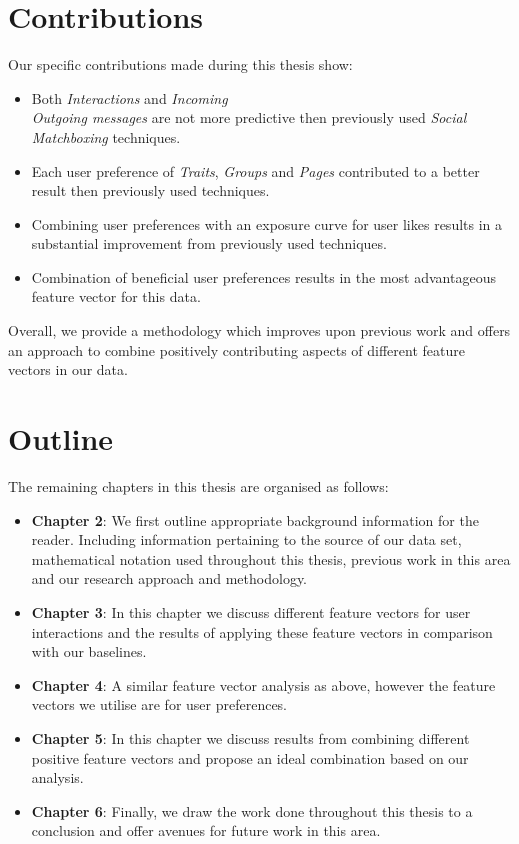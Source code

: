 \section{Contributions}
\label{sec:contributions}

Our specific contributions made during this thesis show:

\begin{itemize}
\item Both \emph{Interactions} and \emph{Incoming\\Outgoing messages} are not more predictive then previously used \emph{Social Matchboxing} 
techniques.
\item Each user preference of \emph{Traits}, \emph{Groups} and \emph{Pages} contributed to a better result then previously used techniques.
\item Combining user preferences with an exposure curve for user likes results in a substantial improvement from previously used techniques.
\item Combination of beneficial user preferences results in the most advantageous feature vector for this data.
\end{itemize} 

Overall, we provide a methodology which improves upon previous work and offers an approach to combine positively contributing aspects of different 
feature vectors in our data.

\section{Outline}
\label{sec:outline}

The remaining chapters in this thesis are organised as follows:
\begin{itemize}
\item \textbf{Chapter 2}: We first outline appropriate background information for the reader. Including information pertaining to the source of 
our data set, mathematical notation used throughout this thesis, previous work in this area and our research approach and methodology.
\item \textbf{Chapter 3}: In this chapter we discuss different feature vectors for user interactions and the results of applying these feature vectors 
in comparison with our baselines.
\item \textbf{Chapter 4}: A similar feature vector analysis as above, however the feature vectors we utilise are for user preferences.
\item \textbf{Chapter 5}: In this chapter we discuss results from combining different positive feature vectors and propose an ideal 
combination based on our analysis.
\item \textbf{Chapter 6}: Finally, we draw the work done throughout this thesis to a conclusion and offer avenues for future work in this area.
\end{itemize}

